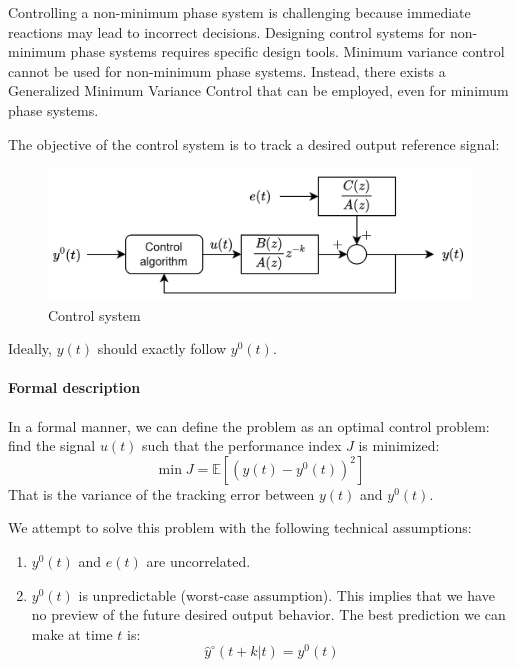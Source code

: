 Controlling a non-minimum phase system is challenging because immediate reactions may lead to incorrect decisions. 
Designing control systems for non-minimum phase systems requires specific design tools. 
Minimum variance control cannot be used for non-minimum phase systems. 
Instead, there exists a Generalized Minimum Variance Control that can be employed, even for minimum phase systems.

The objective of the control system is to track a desired output reference signal:
\begin{figure}[H]
    \centering
    \includegraphics[width=0.4\linewidth]{images/cs.png}
    \caption{Control system}
\end{figure}
Ideally, $y(t)$ should exactly follow $y^{0}(t)$. 

\paragraph*{Formal description}
In a formal manner, we can define the problem as an optimal control problem: find the signal $u(t)$ such that the performance index $J$ is minimized: 
\[\min{J}=\mathbb{E}\left[\left(y(t)-y^{0}(t)\right)^2\right]\]
That is the variance of the tracking error between $y(t)$ and $y^{0}(t)$. 

We attempt to solve this problem with the following technical assumptions:
\begin{enumerate}
    \item $y^{0}(t)$ and $e(t)$ are uncorrelated. 
    \item $y^{0}(t)$ is unpredictable (worst-case assumption). 
        This implies that we have no preview of the future desired output behavior. 
        The best prediction we can make at time $t$ is:
        \[\hat{y}^\circ(t+k|t)=y^{0}(t)\]
\end{enumerate}